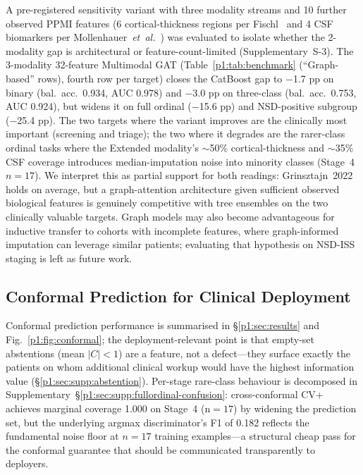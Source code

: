 A pre-registered sensitivity variant with three modality streams and 10 further observed PPMI features (6 cortical-thickness regions per Fischl~\cite{fischl2012} and 4 CSF biomarkers per Mollenhauer~\textit{et~al.}~\cite{mollenhauer2017}) was evaluated to isolate whether the 2-modality gap is architectural or feature-count-limited (Supplementary~S-3). The 3-modality 32-feature Multimodal GAT (Table~\ref{p1:tab:benchmark} (``Graph-based'' rows), fourth row per target) closes the CatBoost gap to $-$1.7 pp on binary (bal.\ acc.\ 0.934, AUC 0.978) and $-$3.0 pp on three-class (bal.\ acc.\ 0.753, AUC 0.924), but widens it on full ordinal ($-$15.6 pp) and NSD-positive subgroup ($-$25.4 pp). The two targets where the variant improves are the clinically most important (screening and triage); the two where it degrades are the rarer-class ordinal tasks where the Extended modality's $\sim$50\% cortical-thickness and $\sim$35\% CSF coverage introduces median-imputation noise into minority classes (Stage~4 $n{=}17$). We interpret this as partial support for both readings: Grinsztajn~2022 holds on average, but a graph-attention architecture given sufficient observed biological features is genuinely competitive with tree ensembles on the two clinically valuable targets. Graph models may also become advantageous for inductive transfer to cohorts with incomplete features, where graph-informed imputation can leverage similar patients; evaluating that hypothesis on NSD-ISS staging is left as future work.

\subsection{Conformal Prediction for Clinical Deployment}
Conformal prediction performance is summarised in \S\ref{p1:sec:results} and Fig.~\ref{p1:fig:conformal}; the deployment-relevant point is that empty-set abstentions (mean $|C|<1$) are a feature, not a defect---they surface exactly the patients on whom additional clinical workup would have the highest information value (\S\ref{p1:sec:supp:abstention}). Per-stage rare-class behaviour is decomposed in Supplementary~\S\ref{p1:sec:supp:fullordinal-confusion}: cross-conformal CV+ achieves marginal coverage 1.000 on Stage~4 (n${=}17$) by widening the prediction set, but the underlying argmax discriminator's F1 of 0.182 reflects the fundamental noise floor at $n{=}17$ training examples---a structural cheap pass for the conformal guarantee that should be communicated transparently to deployers.

